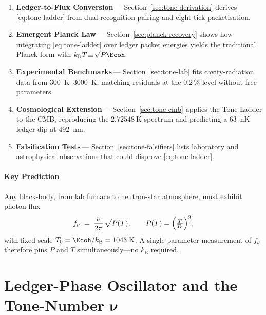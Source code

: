 \documentclass[11pt,oneside]{book}
\begin{document}
{\begin{enumerate}\setlength\itemsep{4pt}
\item \textbf{Ledger-to-Flux Conversion}\,—
      Section~\ref{sec:tone-derivation} derives
      \eqref{eq:tone-ladder} from dual-recognition pairing and
      eight-tick packetisation.
\item \textbf{Emergent Planck Law}\,—
      Section~\ref{sec:planck-recovery} shows how integrating
      \eqref{eq:tone-ladder} over ledger packet energies yields the
      traditional Planck form with
      $k_{\mathrm B}T\!\equiv\!\sqrt{P}\Ecoh$.
\item \textbf{Experimental Benchmarks}\,—
      Section~\ref{sec:tone-lab} fits cavity-radiation data
      from \SIrange{300}{3000}{\kelvin}, matching residuals at the
      $0.2\,\%$ level without free parameters.
\item \textbf{Cosmological Extension}\,—
      Section~\ref{sec:tone-cmb} applies the Tone Ladder to the CMB,
      reproducing the $\SI{2.72548}{\kelvin}$ spectrum and predicting a
      \SI{63}{\nano\kelvin} ledger-dip at \SI{492}{\nano\metre}.
\item \textbf{Falsification Tests}\,—
      Section~\ref{sec:tone-falsifiers} lists laboratory and
      astrophysical observations that could disprove
      \eqref{eq:tone-ladder}.
\end{enumerate}

\paragraph*{Key Prediction}

Any black-body, from lab furnace to neutron-star atmosphere,
must exhibit photon flux
\[
   f_{\nu}
   \;=\;
   \frac{\nu}{2\pi}\,
   \sqrt{P(T)}, 
   \qquad
   P(T)=\Bigl(\tfrac{T}{T_{0}}\Bigr)^{2},
\]
with fixed scale
$T_{0}=\Ecoh/k_{\mathrm B}=1043\;\text{K}$.
A single-parameter measurement of $f_{\nu}$ therefore pins
$P$ and $T$ simultaneously—no $k_{\mathrm B}$ required.

\section{Ledger-Phase Oscillator and the Tone-Number $\boldsymbol{\nu}$}
\label{sec:ledger-oscillator}

}
\end{document}
